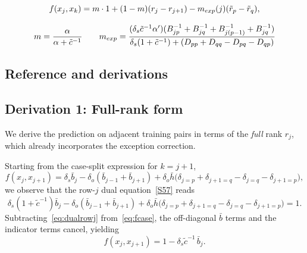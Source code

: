\documentclass{article}
\theoremstyle{plain}
\begin{document}
\begin{equation}
    f(x_j,x_k) = m \cdot 1 + (1-m)(r_j - r_{j+1}) - m_{exp}(j)(\tilde{r}_p - \tilde{r}_{q}),
    \notag
\end{equation}

\begin{equation}
        \\ m = \frac{\alpha}{\alpha + \tilde{c}^{-1}} \qquad m_{exp} = 
        \frac{(\delta_s \tilde{c}^{-1} \alpha')(B^{-1}_{jp} + B^{-1}_{jq} + B^{-1}_{j(p-1)} + B^{-1}_{jq})}{\delta_s (1 + \tilde{c}^{-1}) 
     + (D_{pp} + D_{qq} - D_{pq} - D_{qp})}
\end{equation}
    


\subsection*{Reference and derivations}

\subsection*{Derivation 1: Full-rank form}

We derive the prediction on adjacent training pairs in terms of the
\emph{full} rank $r_j$, which already incorporates the exception correction.

Starting from the case-split expression for $k = j+1$,
\begin{equation}
f(x_j, x_{j+1}) = \delta_s \bar{b}_j - \delta_o(\bar{b}_{j-1} + \bar{b}_{j+1})
+ \delta_o \bar{h}\bigl(\delta_{j=p} + \delta_{j+1=q} - \delta_{j=q} - \delta_{j+1=p}\bigr),
\label{eq:fcase}
\end{equation}
we observe that the row-$j$ dual equation~\eqref{S57} reads
\begin{equation}
\delta_s(1 + \tilde{c}^{-1}) \bar{b}_j - \delta_o(\bar{b}_{j-1} + \bar{b}_{j+1})
+ \delta_o \bar{h}\bigl(\delta_{j=p} + \delta_{j+1=q} - \delta_{j=q} - \delta_{j+1=p}\bigr) = 1.
\label{eq:dualrowj}
\end{equation}
Subtracting~\eqref{eq:dualrowj} from~\eqref{eq:fcase}, the off-diagonal $\bar{b}$ terms
and the indicator terms cancel, yielding
\begin{equation}
f(x_j, x_{j+1}) = 1 - \delta_s \tilde{c}^{-1}\, \bar{b}_j.
\label{eq:fbbar}
\end{equation}
\end{document}
